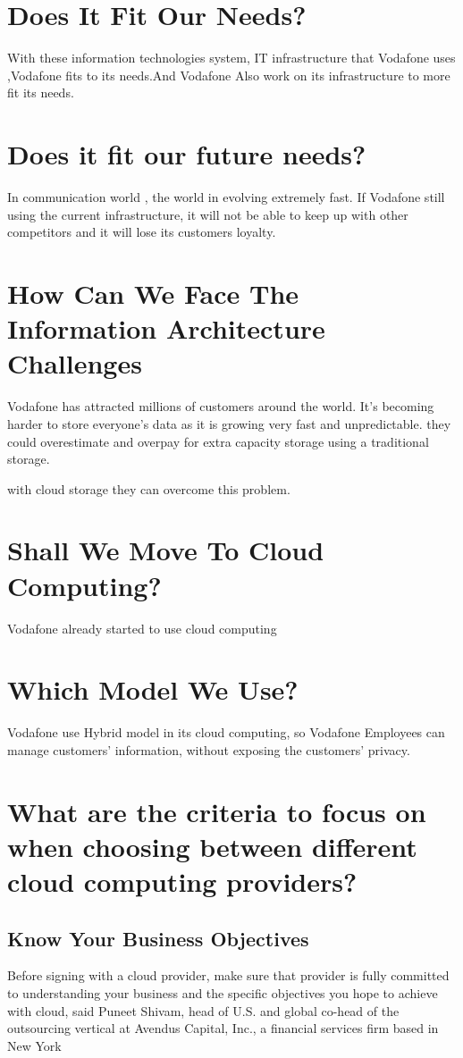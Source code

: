 \documentclass{book}
\begin{document}
\section{Does It Fit Our Needs?}
With these information technologies system, IT infrastructure that Vodafone uses ,Vodafone fits to its needs.And Vodafone Also work on its infrastructure to 	more fit its needs.

\section{Does it fit our future needs?}
In communication world , the world in evolving extremely fast.
If Vodafone still using the current infrastructure, it will not be able to keep up with other competitors and it will lose its customers loyalty.


\section{How Can We Face The Information Architecture Challenges}

Vodafone has attracted millions of customers around the world. It's becoming harder to store everyone's data as it is growing very fast and unpredictable. they could overestimate and overpay for extra capacity storage using a traditional storage.

with cloud storage they can overcome this problem.

\section{Shall We Move To Cloud Computing?}
Vodafone already started to use cloud computing

\section{Which Model We Use?}
Vodafone use Hybrid model in its cloud computing, so Vodafone Employees can manage customers' information, without exposing the customers' privacy.

\section{What are the criteria to focus on when choosing between different cloud computing providers?}
\subsection{Know Your Business Objectives}
Before signing with a cloud provider, make sure that provider is fully committed to understanding your business and the specific objectives you hope to achieve with cloud, said Puneet Shivam, head of U.S. and global co-head of the outsourcing vertical at Avendus Capital, Inc., a financial services firm based in New York
\end{document}
